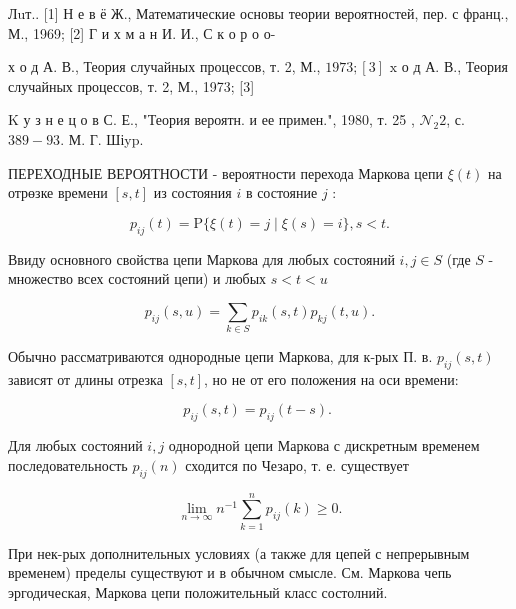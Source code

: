 \documentclass[10pt]{article}
\begin{document}
Лuт.. [1] Н е в ё Ж., Математические основы теории вероятностей, пер. с франц., М., 1969; [2] Г и х м а н И. И., С к о р о о-

х о д А. В., Теория случайных процессов, т. 2, М., $1973 ;[3]$ $\mathrm{x}$ о д А. В., Теория случайных процессов, т. 2, М., 1973; [3]

$\mathrm{K}$ у з н е ц о в С. Е., "Теория вероятн. и ее примен.", 1980, т. 25 , $\mathcal{N}_{2} 2$, с. $389-93$. М. Г. Шіyp.



ПЕРЕХОДНЫЕ ВЕРОЯТНОСТИ - вероятности перехода Маркова цепи $\xi(t)$ на отрөзке времени $[s, t]$ из состояния $i$ в состояние $j$ :



\[

p_{i j}(t)=\mathrm{P}\{\xi(t)=j \mid \xi(s)=i\}, s<t .

\]



Ввиду основного свойства цепи Маркова для любых состояний $i, j \in S$ (где $S$ - множество всех состояний цепи) и любых $s<t<u$



\[

p_{i j}(s, u)=\sum_{k \in S} p_{i k}(s, t) p_{k j}(t, u) .

\]



Обычно рассматриваются однородные цепи Маркова, для к-рых П. в. $p_{i j}(s, t)$ зависят от длины отрезка $[s, t]$, но не от его положения на оси времени:



\[

p_{i j}(s, t)=p_{i j}(t-s) \text {. }

\]



Для любых состояний $i, j$ однородной цепи Маркова с дискретным временем последовательность $p_{i j}(n)$ сходится по Чезаро, т. е. существует



\[

\lim _{n \rightarrow \infty} n^{-1} \sum_{k=1}^{n} p_{i j}(k) \geqslant 0 .

\]



При нек-рых дополнительных условиях (а также для цепей с непрерывным временем) пределы существуют и в обычном смысле. См. Маркова чепь эргодическая, Маркова цепи положительный класс состолний.
\end{document}
